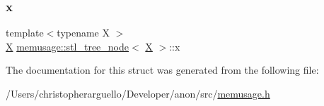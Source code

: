 \mbox{\label{structmemusage_1_1stl__tree__node_a7cf0173eb20148af412cf6ff8a31dc94}} 
\subsubsection{\texorpdfstring{x}{x}}
{\footnotesize\ttfamily template$<$typename X $>$ \\
\mbox{\hyperlink{net_8cpp_a826edd40636cbaa44266b97c8c6a4fa3}{X}} \mbox{\hyperlink{structmemusage_1_1stl__tree__node}{memusage\+::stl\+\_\+tree\+\_\+node}}$<$ \mbox{\hyperlink{net_8cpp_a826edd40636cbaa44266b97c8c6a4fa3}{X}} $>$\+::x\hspace{0.3cm}{\ttfamily [private]}}



The documentation for this struct was generated from the following file\+:\begin{DoxyCompactItemize}
\item 
/\+Users/christopherarguello/\+Developer/anon/src/\mbox{\hyperlink{memusage_8h}{memusage.\+h}}\end{DoxyCompactItemize}
